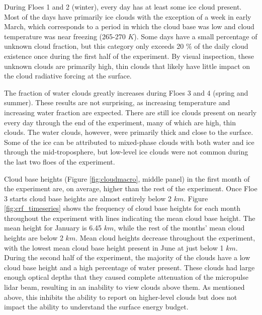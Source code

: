 During Floes 1 and 2 (winter), every day has at least some ice cloud present. Most of the days have primarily ice clouds with the exception of a week in early March, which corresponds to a period in which the cloud base was low and cloud temperature was near freezing (265-270 $K$). Some days have a small percentage of unknown cloud fraction, but this category only exceeds 20 $\%$ of the daily cloud existence once during the first half of the experiment. By visual inspection, these unknown clouds are primarily high, thin clouds that likely have little impact on the cloud radiative forcing at the surface.

The fraction of water clouds greatly increases during Floes 3 and 4 (spring and summer). These results are not surprising, as increasing temperature and increasing water fraction are expected. There are still ice clouds present on nearly every day through the end of the experiment, many of which are high, thin clouds. The water clouds, however, were primarily thick and close to the surface. Some of the ice can be attributed to mixed-phase clouds with both water and ice through the mid-troposphere, but low-level ice clouds were not common during the last two floes of the experiment.

Cloud base heights (Figure \ref{fig:cloudmacro}, middle panel) in the first month of the experiment are, on average, higher than the rest of the experiment. Once Floe 3 starts cloud base heights are almost entirely below 2 $km$. Figure \ref{fig:crf_timeseries} shows the frequency of cloud base heights for each month throughout the experiment with lines indicating the mean cloud base height. The mean height for January is 6.45 $km$, while the rest of the months' mean cloud heights are below 2 $km$. Mean cloud heights decrease throughout the experiment, with the lowest mean cloud base height present in June at just below 1 $km$. During the second half of the experiment, the majority of the clouds have a low cloud base height and a high percentage of water present. These clouds had large enough optical depths that they caused complete attenuation of the micropulse lidar beam, resulting in an inability to view clouds above them. As mentioned above, this inhibits the ability to report on higher-level clouds but does not impact the ability to understand the surface energy budget.

